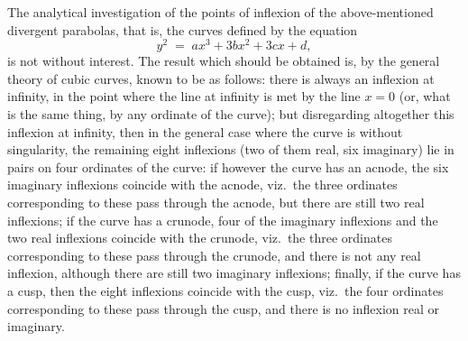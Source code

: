 \documentclass[11pt,a4paper]{article}
\begin{document}
The analytical investigation of the points of inflexion of the above-mentioned divergent parabolas, that is, the curves defined by the equation
\[
y^2 \;=\; ax^3 + 3bx^2 + 3cx + d,
\]
is not without interest. The result which should be obtained is, by the general theory of cubic curves, known to be as follows: there is always an inflexion at infinity, in the point where the line at infinity is met by the line $x = 0$ (or, what is the same thing, by any ordinate of the curve); but disregarding altogether this inflexion at infinity, then in the general case where the curve is without singularity, the remaining eight inflexions (two of them real, six imaginary) lie in pairs on four ordinates of the curve: if however the curve has an acnode, the six imaginary inflexions coincide with the acnode, viz.\ the three ordinates corresponding to these pass through the acnode, but there are still two real inflexions; if the curve has a crunode, four of the imaginary inflexions and the two real inflexions coincide with the crunode, viz.\ the three ordinates corresponding to these pass through the crunode, and there is not any real inflexion, although there are still two imaginary inflexions; finally, if the curve has a cusp, then the eight inflexions coincide with the cusp, viz.\ the four ordinates corresponding to these pass through the cusp, and there is no inflexion real or imaginary.

\medskip
\end{document}
